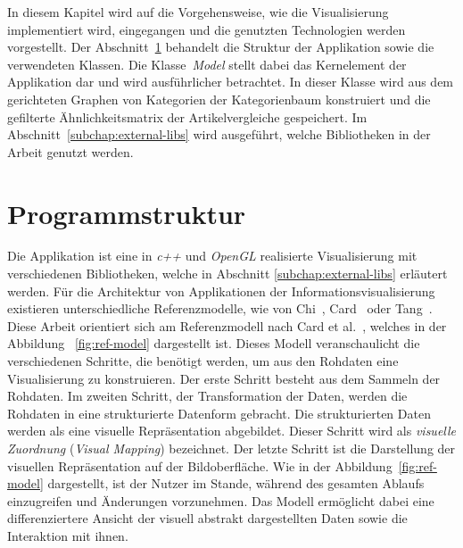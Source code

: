
In diesem Kapitel wird auf die Vorgehensweise, wie die Visualisierung implementiert wird, eingegangen und die genutzten Technologien werden vorgestellt. Der Abschnitt~\ref{subchap:app-struct} behandelt die Struktur der Applikation sowie die verwendeten Klassen. %
Die Klasse~\emph{Model} stellt dabei das Kernelement der Applikation dar und wird ausführlicher betrachtet.
In dieser Klasse wird aus dem gerichteten Graphen von Kategorien der Kategorienbaum konstruiert und die gefilterte Ähnlichkeitsmatrix der Artikelvergleiche gespeichert.
Im Abschnitt~\ref{subchap:external-libs} wird ausgeführt, welche Bibliotheken in der Arbeit genutzt werden.


\section{Programmstruktur} \label{subchap:app-struct}
Die Applikation ist eine in \emph{c++} und \emph{OpenGL} realisierte Visualisierung mit verschiedenen Bibliotheken, welche in Abschnitt \ref{subchap:external-libs} erläutert werden.
Für die Architektur von Applikationen der Informationsvisualisierung existieren unterschiedliche Referenzmodelle, wie von Chi~\cite{EdHuaiHsinChi}, Card~\cite{card1999readings} oder Tang~\cite{Tang2004}.
Diese Arbeit orientiert sich am Referenzmodell nach Card et al.~\cite{card1999readings}, welches in der Abbildung~ \ref{fig:ref-model} dargestellt ist.
Dieses Modell veranschaulicht die verschiedenen Schritte, die benötigt werden, um aus den Rohdaten eine Visualisierung zu konstruieren.
Der erste Schritt besteht aus dem Sammeln der Rohdaten.
Im zweiten Schritt, der Transformation der Daten, werden die Rohdaten in eine strukturierte Datenform gebracht.
Die strukturierten Daten werden als eine visuelle Repräsentation abgebildet.
Dieser Schritt wird als \emph{visuelle Zuordnung} (\emph{Visual Mapping}) bezeichnet.
Der letzte Schritt ist die Darstellung der visuellen Repräsentation auf der Bildoberfläche.
Wie in der Abbildung~\ref{fig:ref-model} dargestellt, ist der Nutzer im Stande, während des gesamten Ablaufs einzugreifen und Änderungen vorzunehmen.
Das Modell ermöglicht dabei eine differenziertere Ansicht der visuell abstrakt dargestellten Daten sowie die Interaktion mit ihnen.

